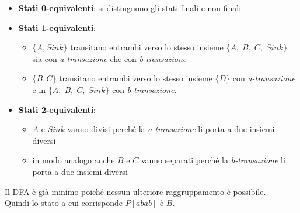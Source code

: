 \documentclass[11pt]{article}
\begin{document}
\begin{tcolorbox}[colframe=orange!70!black, colback=orange!10!white, title=\textbf{\textit{Spiegazione}}]
\begin{itemize}
    \item \textbf{Stati 0-equivalenti}: si distinguono gli stati finali e non finali
    \item \textbf{Stati 1-equivalenti}: 
    \begin{itemize}
      \item $\{A, Sink\}$ transitano entrambi verso lo stesso insieme $\{A,\;B,\;C,\;Sink\}$ sia con \textit{a-transazione} che con \textit{b-transazione}
      \item $\{B, C\}$ transitano entrambi verso lo stesso insieme $\{D\}$ con \textit{a-transazione} e in $\{A,\;B,\;C,\;Sink\}$ con \textit{b-transazione}.
    \end{itemize}
    \item \textbf{Stati 2-equivalenti}:
    \begin{itemize}
      \item $A$ e $Sink$ vanno divisi perché la \textit{a-transazione} li porta a due insiemi diversi
      \item in modo analogo anche $B$ e $C$ vanno separati perché la \textit{b-transazione} li porta a due insiemi diversi
    \end{itemize}
\end{itemize}
\end{tcolorbox}
\noindent 
Il DFA è già minimo poiché nessun ulteriore raggruppamento è possibile. \\
Quindi lo stato a cui corrisponde $P[abab]$ è $B$.
\end{document}
